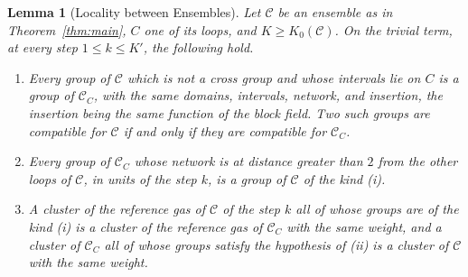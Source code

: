 \documentclass[11pt]{preprint}
\numberwithin{equation}{section}
\newtheorem{lemma}[theorem]{Lemma}
\theoremstyle{definition}
\theoremstyle{remark}
\theoremstyle{plain}
\begin{document}
\begin{lemma}[Locality between Ensembles]\label{lem:ensemble-locality}
Let $\mathcal C$ be an ensemble as in Theorem~\ref{thm:main}, $C$ one of its loops, and $K \geq K_0(\mathcal C)$. On the trivial term, at every step $1 \leq k \leq K'$, the following hold.
\begin{enumerate}[label=(\roman*)]
\item Every group of $\mathcal C$ which is not a cross group and whose intervals lie on $C$ is a group of $\mathcal C_C$, with the same domains, intervals, network, and insertion, the insertion being the same function of the block field. Two such groups are compatible for $\mathcal C$ if and only if they are compatible for $\mathcal C_C$.
\item Every group of $\mathcal C_C$ whose network is at distance greater than $2$ from the other loops of $\mathcal C$, in units of the step $k$, is a group of $\mathcal C$ of the kind (i).
\item A cluster of the reference gas of $\mathcal C$ of the step $k$ all of whose groups are of the kind (i) is a cluster of the reference gas of $\mathcal C_C$ with the same weight, and a cluster of $\mathcal C_C$ all of whose groups satisfy the hypothesis of (ii) is a cluster of $\mathcal C$ with the same weight.
\end{enumerate}
\end{lemma}
\end{document}
